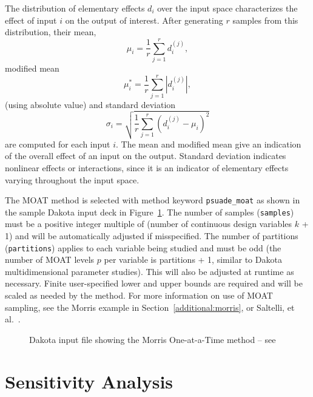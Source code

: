 The distribution of elementary effects $d_i$ over the input space
characterizes the effect of input $i$ on the output of interest.
After generating $r$ samples from this distribution, their mean,
\begin{equation}
\mu_i = \frac{1}{r}\sum_{j=1}^{r}{d_i^{(j)}},
\end{equation}
modified mean
\begin{equation}
\mu_i^* = \frac{1}{r}\sum_{j=1}^{r}{|d_i^{(j)}|},
\end{equation}
(using absolute value) and standard deviation
\begin{equation}
\sigma_i = \sqrt{ \frac{1}{r}\sum_{j=1}^{r}{ \left(d_i^{(j)} - \mu_i
\right)^2} }
\end{equation}
are computed for each input $i$. The mean and modified mean give an
indication of the overall effect of an input on the output. Standard
deviation indicates nonlinear effects or interactions, since it is an
indicator of elementary effects varying throughout the input space.

The MOAT method is selected with method keyword {\tt psuade\_moat} as
shown in the sample Dakota input deck in Figure~\ref{FIG:moat_input}.
The number of samples ({\tt samples}) must be a positive integer
multiple of (number of continuous design variables $k$ + 1) and will
be automatically adjusted if misspecified. The number of partitions
({\tt partitions}) applies to each variable being studied and must be
odd (the number of MOAT levels $p$ per variable is partitions + 1,
similar to Dakota multidimensional parameter studies). This will also
be adjusted at runtime as necessary. Finite user-specified lower and
upper bounds are required and will be scaled as needed by the method.
For more information on use of MOAT sampling, see the Morris example
in Section~\ref{additional:morris}, or Saltelli, et al.~\cite{Sal04}.

\begin{figure}
  \centering \begin{bigbox} \begin{small}
   \end{small} \end{bigbox}
\caption{Dakota input file showing the Morris One-at-a-Time method --
see \protect{} }
\label{FIG:moat_input}
\end{figure}

\section{Sensitivity Analysis}\label{dace:sa}

